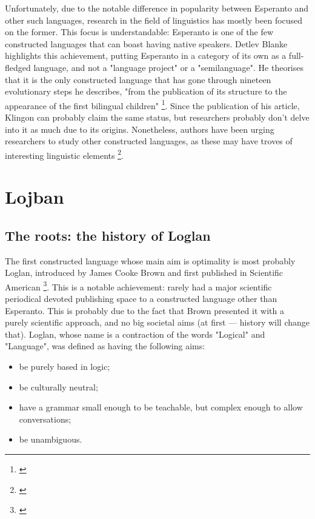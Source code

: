 \vspace{-0.05cm}
Unfortunately, due to the notable difference in popularity between Esperanto and other such languages, research in the field of linguistics has mostly been focused on the former.
This focus is understandable: Esperanto is one of the few constructed languages that can boast having native speakers. Detlev Blanke highlights this achievement, putting Esperanto
in a category of its own as a full-fledged language, and not a "language project" or a "semilanguage". He theorises that it is the only constructed language that has gone through nineteen
evolutionary steps he describes, "from the publication of its structure to the appearance of the first bilingual children" \footnote{\cite{blanke1989planned}}.
Since the publication of his article, Klingon can probably claim the same status, but researchers probably don't delve into it as much due to its origins.
Nonetheless, authors have been urging researchers to study other constructed languages, as these may have troves of interesting linguistic elements \footnote{\cite{oostendorp2001constructed}}.

\section{Lojban}

\subsection{The roots: the history of Loglan}

The first constructed language whose main aim is optimality is most probably Loglan, introduced by James Cooke Brown and first published
in Scientific American \footnote{\cite{brown1960loglan}}. This is a notable achievement: rarely had a major scientific periodical devoted publishing
space to a constructed language other than Esperanto. This is probably due to the fact that Brown presented it with a purely scientific approach, and no big societal aims
(at first --- history will change that). Loglan, whose name is a contraction of the words "Logical" and "Language", was defined as having the following aims:

\begin{itemize}
    \setlength\itemsep{-0.5em}
    \item be purely based in logic;
    \item be culturally neutral;
    \item have a grammar small enough to be teachable, but complex enough to allow conversations;
    \item be unambiguous.
 \end{itemize}


